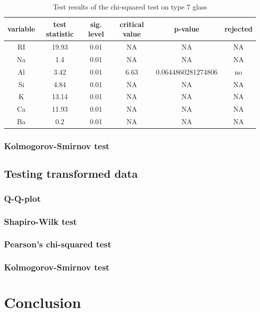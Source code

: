 \documentclass[a4paper, 12pt, titlepage, headsepline, listof = totoc, bibliography = totoc, numbers = noenddot]{scrartcl}
\begin{document}
\begin{table}[h!]
\centering
\begin{tabular}{|cccccc|} \hline variable & test statistic & sig. level & critical value & p-value & rejected\\ \hline RI & 19.93 & 0.01 & NA & NA & NA\\ 
Na & 1.4 & 0.01 & NA & NA & NA\\ 
Al & 3.42 & 0.01 & 6.63 & 0.0644860281274806 & no\\ 
Si & 4.84 & 0.01 & NA & NA & NA\\ 
K & 13.14 & 0.01 & NA & NA & NA\\ 
Ca & 11.93 & 0.01 & NA & NA & NA\\ 
Ba & 0.2 & 0.01 & NA & NA & NA\\ \hline \end{tabular}\caption{Test results of the chi-squared test on type 7 glass}
\label{tab:chi-type7}
\end{table}

\subsubsection{Kolmogorov-Smirnov test}



\subsection{Testing transformed data}

\subsubsection{Q-Q-plot}

\subsubsection{Shapiro-Wilk test}

\subsubsection{Pearson's chi-squared test}

\subsubsection{Kolmogorov-Smirnov test}

\newpage
\section{Conclusion}
\end{document}
